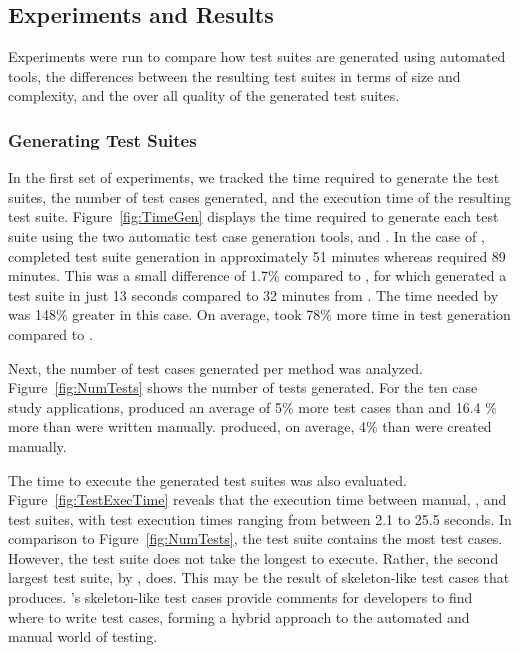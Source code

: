 \subsection{Experiments and Results}
Experiments were run to compare how test suites are generated using automated tools, the differences between the resulting test suites in terms of size and complexity, and the over all quality of the generated test suites.  

\subsubsection{Generating Test Suites }
In the first set of experiments, we tracked the time required to generate the test suites, the number of test cases generated, and the execution time of the resulting test suite.  Figure~\ref{fig:TimeGen} displays the time required to generate each test suite using the two automatic test case generation tools, \codepro and \evo.  In the case of \netweaver, \codepro completed test suite generation in approximately 51 minutes whereas \evo required 89 minutes.  This was a small difference of 1.7\% compared to \xisemele, for which \codepro generated a test suite in just 13 seconds compared to 32 minutes from \evo.  The time needed by \evo was 148\% greater in this case.  On average, \evo took 78\% more time in test generation compared to \codepro.

Next, the number of test cases generated per method was analyzed.  Figure~\ref{fig:NumTests} shows the number of tests generated.  For the ten case study applications, \codepro produced an average of  5\% more test cases than \evo and 16.4 \% more than were written manually.  \evo produced, on average, 4\% than were created manually. 

The time to execute the generated test suites was also evaluated. Figure~\ref{fig:TestExecTime} reveals that the execution time between manual, \evo, and \codepro test suites, with test execution times ranging from between 2.1 to 25.5 seconds. In comparison to Figure~\ref{fig:NumTests}, the \netweaver test suite contains the most test cases. However, the \netweaver \codepro test suite does not take the longest to execute.  Rather, the second largest test suite, \jsecurity by \evo, does. This may be the result of skeleton-like test cases that \codepro produces. \codepro's skeleton-like test cases provide comments for developers to find where to write test cases, forming a hybrid approach to the automated and manual world of testing.%

